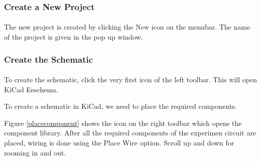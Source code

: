 \subsubsection{Create a New Project}

\paragraph{ } The new project is created by clicking the New icon on the
menubar. The name of the project is given in the pop up window.%

\subsubsection{Create the Schematic}

\paragraph{}  To create the schematic, click the very first icon of the
left toolbar.%
This will open KiCad Eeschema.



To create a schematic in KiCad, we need to place the required components. %


 Figure \ref{placecomponent}
shows the icon on the right toolbar which opens the component library. After all the required components of the experimen circuit are placed, wiring is
done using the Place Wire option. %
 Scroll up and down for zooming in and out.




